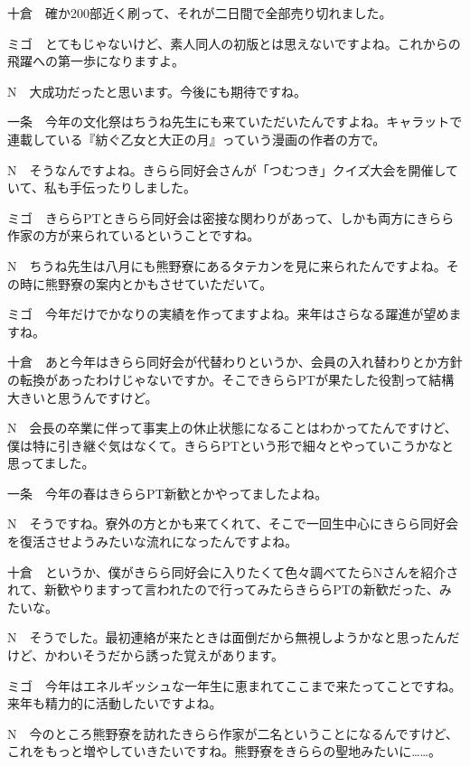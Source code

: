 \begin{multicols}{2}
\begin{description}
  \item{十倉}　確か200部近く刷って、それが二日間で全部売り切れました。
  \item{ミゴ}　とてもじゃないけど、素人同人の初版とは思えないですよね。これからの飛躍への第一歩になりますよ。
  \item{N}　大成功だったと思います。今後にも期待ですね。
  \item{一条}　今年の文化祭はちうね先生にも来ていただいたんですよね。キャラットで連載している『紡ぐ乙女と大正の月』っていう漫画の作者の方で。
  \item{N}　そうなんですよね。きらら同好会さんが「つむつき」クイズ大会を開催していて、私も手伝ったりしました。
  \item{ミゴ}　きららPTときらら同好会は密接な関わりがあって、しかも両方にきらら作家の方が来られているということですね。
  \item{N}　ちうね先生は八月にも熊野寮にあるタテカンを見に来られたんですよね。その時に熊野寮の案内とかもさせていただいて。
  \item{ミゴ}　今年だけでかなりの実績を作ってますよね。来年はさらなる躍進が望めますね。
  \item{十倉}　あと今年はきらら同好会が代替わりというか、会員の入れ替わりとか方針の転換があったわけじゃないですか。そこできららPTが果たした役割って結構大きいと思うんですけど。
  \item{N}　会長の卒業に伴って事実上の休止状態になることはわかってたんですけど、僕は特に引き継ぐ気はなくて。きららPTという形で細々とやっていこうかなと思ってました。
  \item{一条}　今年の春はきららPT新歓とかやってましたよね。
  \item{N}　そうですね。寮外の方とかも来てくれて、そこで一回生中心にきらら同好会を復活させようみたいな流れになったんですよね。
  \item{十倉}　というか、僕がきらら同好会に入りたくて色々調べてたらNさんを紹介されて、新歓やりますって言われたので行ってみたらきららPTの新歓だった、みたいな。
  \item{N}　そうでした。最初連絡が来たときは面倒だから無視しようかなと思ったんだけど、かわいそうだから誘った覚えがあります。
  \item{ミゴ}　今年はエネルギッシュな一年生に恵まれてここまで来たってことですね。来年も精力的に活動したいですよね。
  \item{N}　今のところ熊野寮を訪れたきらら作家が二名ということになるんですけど、これをもっと増やしていきたいですね。熊野寮をきららの聖地みたいに……。
\end{description}


\end{multicols}
